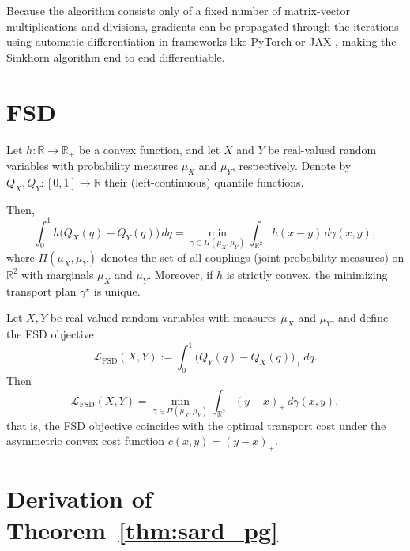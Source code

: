 Because the algorithm consists only of a fixed number of matrix-vector multiplications and divisions, gradients can be propagated through the iterations using automatic differentiation in frameworks like PyTorch \citep{NEURIPS2019_9015} or JAX \citep{jax2018github}, making the Sinkhorn algorithm end to end differentiable.

\section{FSD}
\label{supp:FSD}

\begin{theorem}
  \label{thm:fsd_as_ot}
  Let $h : \mathbb{R} \to \mathbb{R}_{+}$ be a convex function, and let
  $X$ and $Y$ be real-valued random variables with probability measures
  $\mu_X$ and $\mu_Y$, respectively. Denote by
  $Q_X, Q_Y : [0,1] \to \mathbb{R}$ their (left-continuous) quantile functions.

  Then,
  \begin{equation}
    \int_0^1 h\big(Q_X(q) - Q_Y(q)\big)\, dq
    =
    \min_{\gamma \in \Pi(\mu_X,\mu_Y)}
    \int_{\mathbb{R}^2} h(x-y)\, d\gamma(x,y),
  \end{equation}
  where $\Pi(\mu_X,\mu_Y)$ denotes the set of all couplings
  (joint probability measures) on $\mathbb{R}^2$ with marginals
  $\mu_X$ and $\mu_Y$. Moreover, if $h$ is strictly convex, the minimizing transport plan $\gamma^\star$ is unique.
\end{theorem}

\begin{corollary}
  \label{cor:fsd_as_ot}
  Let $X,Y$ be real-valued random variables with measures
  $\mu_X$ and $\mu_Y$, and define the FSD objective
  \[
    \mathcal{L}_{\mathrm{FSD}}(X,Y)
    :=
    \int_0^1 \big(Q_Y(q) - Q_X(q)\big)_+ \, dq.
  \]
  Then
  \[
    \mathcal{L}_{\mathrm{FSD}}(X,Y)
    =
    \min_{\gamma \in \Pi(\mu_X,\mu_Y)}
    \int_{\mathbb{R}^2} (y-x)_+ \, d\gamma(x,y),
  \]
  that is, the FSD objective coincides with the optimal transport cost under the
  asymmetric convex cost function $c(x,y)=(y-x)_+$.
\end{corollary}

\section{Derivation of Theorem~\ref{thm:sard_pg}}\label{app:sard_pg_derivation}

